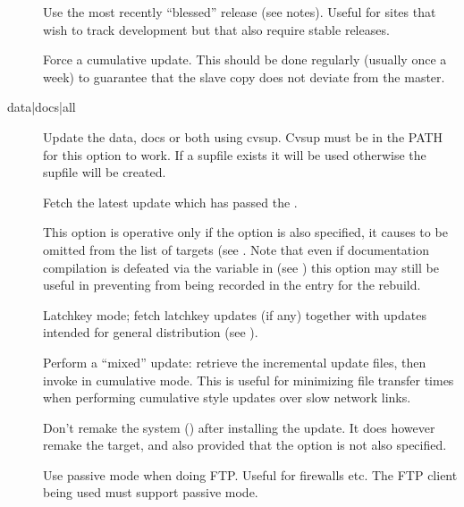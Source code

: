 \begin{description}
\item[]
   Use the most recently ``blessed'' release (see notes).  Useful for
   sites that wish to track development but that also require stable
   releases.

\item[]
   Force a cumulative update.  This should be done regularly (usually once a
   week) to guarantee that the slave copy does not deviate from the master.

\item[ data|docs|all]
   Update the data, docs or both using cvsup.  Cvsup must be in the PATH for
   this option to work.  If a supfile exists it will be used otherwise the 
   supfile will be created.

\item[]
   Fetch the latest update which has passed the .

\item[]
   This option is operative only if the  option is also specified, it
   causes  to be omitted from the list of targets (see
   .  Note that even if documentation compilation is
   defeated via the  variable in  (see
   ) this option may still be useful in preventing
    from being recorded in the  entry for the
   rebuild.

\item[]
   Latchkey mode; fetch latchkey updates (if any) together with updates
   intended for general distribution (see ).

\item[]
   Perform a ``mixed'' update: retrieve the incremental update files,
   then invoke  in cumulative mode.  This is useful for
   minimizing file transfer times when performing cumulative style
   updates over slow network links.

\item[]
   Don't remake the system () after installing the update.  It
   does however remake the  target, and also 
   provided that the  option is not also specified.

\item[]
  Use passive mode when doing FTP. Useful for firewalls etc. The
  FTP client being used must support passive mode.


\end{description}

